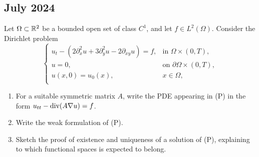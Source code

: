 \newpage
\subsection{July 2024}
\begin{exercise}
    Let \(\Omega \subset \mathbb{R}^2\) be a bounded open set of class \(C^1\), and let \(f \in L^2(\Omega)\). Consider the Dirichlet problem
    \begin{equation*}
        \begin{cases}
            u_{t} - \left(2\partial_x^2 u +  3\partial_y^2 u - 2 \partial_{xy} u\right) = f, & \text{in } \Omega \times (0, T),          \\
            u = 0,                                                                           & \text{on } \partial \Omega \times (0, T), \\
            u(x,0) = u_0(x),                                                                 & x \in \Omega,                             \\
        \end{cases}
        \tag{(P)}
    \end{equation*}
    \begin{enumerate}
        \item For a suitable symmetric matrix \(A\), write the PDE appearing in (P) in the
              form \(u_{tt} - \text{div}(A \nabla u) = f\).
        \item Write the weak formulation of (P).
        \item Sketch the proof of existence and uniqueness of a solution of (P), explaining
              to which functional spaces is expected to belong.
    \end{enumerate}
\end{exercise}
